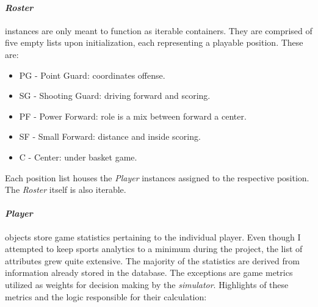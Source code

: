 \documentclass{thesis-ekf}
\theoremstyle{definition}
\theoremstyle{remark}
\begin{document}
\paragraph{\emph{Roster}} instances are only meant to function as iterable  containers. They are comprised of five empty lists upon initialization, each representing a playable position. These are:
\begin{itemize}
	\item PG - Point Guard: coordinates offense.
	\item SG - Shooting Guard: driving forward and scoring.
	\item PF - Power Forward: role is a mix between forward a center.
	\item SF - Small Forward: distance and inside scoring.
	\item C - Center: under basket game.
\end{itemize}
Each position list houses the \emph{Player} instances assigned to the respective position. The \emph{Roster} itself is also iterable.

\paragraph{\emph{Player}} objects store game statistics pertaining to the individual player. Even though I attempted to keep sports analytics to a minimum during the project, the list of attributes grew quite extensive. The majority of the statistics are derived from information already stored in the database. The exceptions are game metrics utilized as weights for decision making by the \emph{simulator}. Highlights of these metrics and the logic responsible for their calculation:
\end{document}
